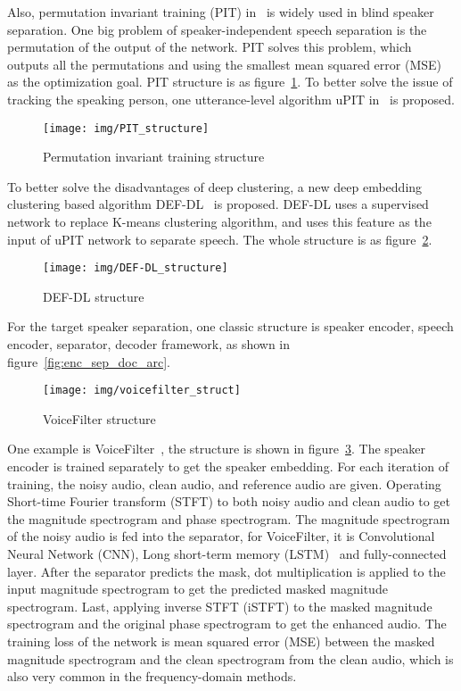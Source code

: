 Also, permutation invariant training (PIT) in~\cite{PIT} is widely used in blind speaker separation.
One big problem of speaker-independent speech separation is the permutation of the output of the network.
PIT solves this problem, which outputs all the permutations and using the smallest mean squared error (MSE) as the optimization goal.
PIT structure is as figure~\ref{fig:PIT_structure}.
To better solve the issue of tracking the speaking person, one utterance-level algorithm uPIT in~\cite{uPIT} is proposed.
\begin{figure}[!htbp]
    \centering
    \texttt{[image: img/PIT\_structure]}
    \caption{Permutation invariant training structure~\cite{PIT}}
    \label{fig:PIT_structure}
\end{figure}

To better solve the disadvantages of deep clustering, a new deep embedding clustering based algorithm DEF-DL~\cite{DEF-DL} is proposed.
DEF-DL uses a supervised network to replace K-means clustering algorithm, and uses this feature as the input of uPIT network to separate speech.
The whole structure is as figure~\ref{fig:def_dl_structure}.
\begin{figure}[!htbp]
    \centering
    \texttt{[image: img/DEF-DL\_structure]}
    \caption{DEF-DL structure~\cite{DEF-DL}}
    \label{fig:def_dl_structure}
\end{figure}
For the target speaker separation, one classic structure is speaker encoder, speech encoder, separator, decoder framework, as shown in figure~\ref{fig:enc_sep_doc_arc}.

\begin{figure}[!htbp]
    \centering
    \texttt{[image: img/voicefilter\_struct]}
    \caption{VoiceFilter structure~\cite{voicefilter}}
    \label{fig:voicefilter_struct}
\end{figure}

One example is VoiceFilter~\cite{voicefilter}, the structure is shown in figure~\ref{fig:voicefilter_struct}.
The speaker encoder is trained separately to get the speaker embedding.
For each iteration of training, the noisy audio, clean audio, and reference audio are given.
Operating Short-time Fourier transform (STFT) to both noisy audio and clean audio to get the magnitude spectrogram and phase spectrogram.
The magnitude spectrogram of the noisy audio is fed into the separator, for VoiceFilter, it is Convolutional Neural Network (CNN), Long short-term memory (LSTM)~\cite{LSTM} and fully-connected layer.
After the separator predicts the mask, dot multiplication is applied to the input magnitude spectrogram to get the predicted masked magnitude spectrogram.
Last, applying inverse STFT (iSTFT) to the masked magnitude spectrogram and the original phase spectrogram to get the enhanced audio.
The training loss of the network is mean squared error (MSE) between the masked magnitude spectrogram and the clean spectrogram from the clean audio, which is also very common in the frequency-domain methods.

